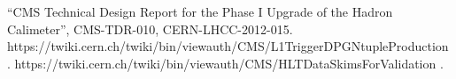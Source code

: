 \documentclass[11pt]{cmspaperpdf}
\begin{document}
\newpage

\begin{thebibliography}{99}

 ``CMS Technical Design Report for the Phase I Upgrade of the Hadron Calimeter'', CMS-TDR-010, CERN-LHCC-2012-015.
 https://twiki.cern.ch/twiki/bin/viewauth/CMS/L1TriggerDPGNtupleProduction .
 https://twiki.cern.ch/twiki/bin/viewauth/CMS/HLTDataSkimsForValidation .

\end{thebibliography}

\clearpage
\appendix
\end{document}
